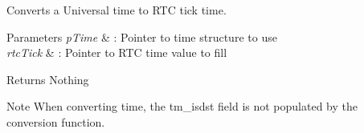 Converts a Universal time to R\+TC tick time. 


\begin{DoxyParams}{Parameters}
{\em p\+Time} & \+: Pointer to time structure to use \\
\hline
{\em rtc\+Tick} & \+: Pointer to R\+TC time value to fill \\
\hline
\end{DoxyParams}
\begin{DoxyReturn}{Returns}
Nothing 
\end{DoxyReturn}
\begin{DoxyNote}{Note}
When converting time, the \textquotesingle{}tm\+\_\+isdst\textquotesingle{} field is not populated by the conversion function. 
\end{DoxyNote}
